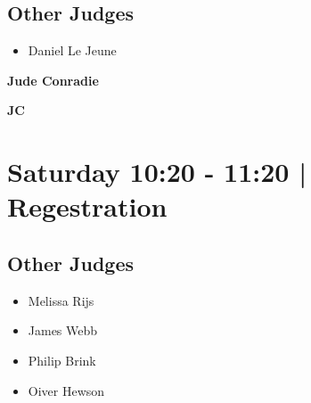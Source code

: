 \documentclass[10pt]{article}
\newcommand{\newtitle}[1]{\begin{center}{\Huge\bfseries #1 }\\ \vspace{5mm}\end{center}}
\newcommand{\newsubtitle}[1]{\begin{center}{\color{grey}\Large\bfseries #1 }\\ \vspace{5mm}\end{center}}
\begin{document}
        \subsection*{Other Judges}
        
            \begin{itemize}
                            \item Daniel Le Jeune
                        \end{itemize}
        

    
	\clearpage

		\newtitle{Jude Conradie}
	\newsubtitle{JC}

            \section*{Saturday 10:20
        -
        11:20
        |
         Regestration}
        
                
        \subsection*{Other Judges}
        
            \begin{itemize}
                            \item Melissa Rijs
                            \item James Webb
                            \item Philip Brink
                            \item Oiver Hewson
                        \end{itemize}
        

    
	\clearpage

	
\end{document}
